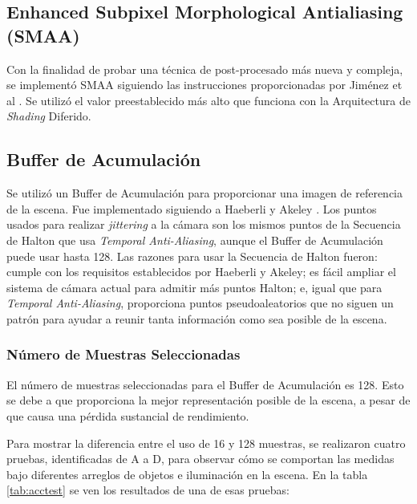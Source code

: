 \documentclass[pregrado]{tesis-usb} %
\begin{document}
\subsection{Enhanced Subpixel Morphological Antialiasing (SMAA)}
Con la finalidad de probar una técnica de post-procesado más nueva y compleja, se implementó SMAA siguiendo las instrucciones proporcionadas por Jiménez et al \cite{Jimenez2012}. Se utilizó el valor preestablecido más alto que funciona con la Arquitectura de \textit{Shading} Diferido.

\subsection{Buffer de Acumulación}
Se utilizó un Buffer de Acumulación para proporcionar una imagen de referencia de la escena. Fue implementado siguiendo a Haeberli y Akeley \cite{Haeberli1990}. Los puntos usados para realizar \textit{jittering} a la cámara son los mismos puntos de la Secuencia de Halton que usa \textit{Temporal Anti-Aliasing}, aunque el Buffer de Acumulación puede usar hasta 128. Las razones para usar la Secuencia de Halton fueron: cumple con los requisitos establecidos por Haeberli y Akeley; es fácil ampliar el sistema de cámara actual para admitir más puntos Halton; e, igual que para \textit{Temporal Anti-Aliasing}, proporciona puntos pseudoaleatorios que no siguen un patrón para ayudar a reunir tanta información como sea posible de la escena.

\subsubsection{Número de Muestras Seleccionadas}
El número de muestras seleccionadas para el Buffer de Acumulación es 128. Esto se debe a que proporciona la mejor representación posible de la escena, a pesar de que causa una pérdida sustancial de rendimiento.

Para mostrar la diferencia entre el uso de 16 y 128 muestras, se realizaron cuatro pruebas, identificadas de A a D, para observar cómo se comportan las medidas bajo diferentes arreglos de objetos e iluminación en la escena. En la tabla \ref{tab:acctest} se ven los resultados de una de esas pruebas:
\end{document}
